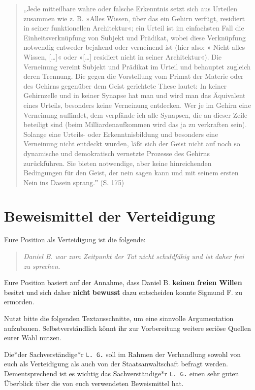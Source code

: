 \documentclass[
  a4paper,
]{report}
\begin{document}
\begin{quote}
„Jede mitteilbare wahre oder falsche Erkenntnis setzt sich aus Urteilen zusammen wie z. B. »Alles Wissen, über das ein Gehirn verfügt, residiert in seiner funktionellen Architektur«; ein Urteil ist im einfachsten Fall die Einheitsverknüpfung von Subjekt und Prädikat, wobei diese Verknüpfung notwendig entweder bejahend oder verneinend ist (hier also: » Nicht alles Wissen, {[}\ldots{]}« oder »{[}\ldots{]} residiert nicht in seiner Architektur«). Die Verneinung vereint Subjekt und Prädikat im Urteil und behauptet zugleich deren Trennung. Die gegen die Vorstellung vom Primat der Materie oder des Gehirns gegenüber dem Geist gerichtete These lautet: In keiner Gehirnzelle und in keiner Synapse hat man und wird man das Äquivalent eines Urteils, besonders keine Verneinung entdecken. Wer je im Gehirn eine Verneinung auffindet, dem verpfände ich alle Synapsen, die an dieser Zeile beteiligt sind (beim Milliardenaufkommen wird das ja zu verkraften sein). Solange eine Urteils- oder Erkenntnisbildung und besonders eine Verneinung nicht entdeckt wurden, läßt sich der Geist nicht auf noch so dynamische und demokratisch vernetzte Prozesse des Gehirns zurückführen. Sie bieten notwendige, aber keine hinreichenden Bedingungen für den Geist, der nein sagen kann und mit seinem ersten Nein ins Dasein sprang.‟ (S. 175)
\end{quote}

\hypertarget{defence-evidence}{%
\chapter{Beweismittel der Verteidigung}\label{defence-evidence}}

Eure Position als Verteidigung ist die folgende:

\begin{quote}
\emph{Daniel B. war zum Zeitpunkt der Tat nicht schuldfähig und ist daher frei zu sprechen.}
\end{quote}

Eure Position basiert auf der Annahme, dass Daniel B. \textbf{keinen} \textbf{freien Willen} besitzt und sich daher \textbf{nicht} \textbf{bewusst} dazu entscheiden konnte Sigmund F. zu ermorden.

Nutzt bitte die folgenden Textausschnitte, um eine sinnvolle Argumentation aufzubauen. Selbstverständlich könnt ihr zur Vorbereitung weitere seriöse Quellen eurer Wahl nutzen.

Die*der Sachverständige*r \texttt{L.\ G.} soll im Rahmen der Verhandlung sowohl von euch als Verteidigung als auch von der Staatsanwaltschaft befragt werden. Dementsprechend ist es wichtig das Sachverständige*r \texttt{L.\ G.} einen sehr guten Überblick über die von euch verwendeten Beweismittel hat.
\end{document}
